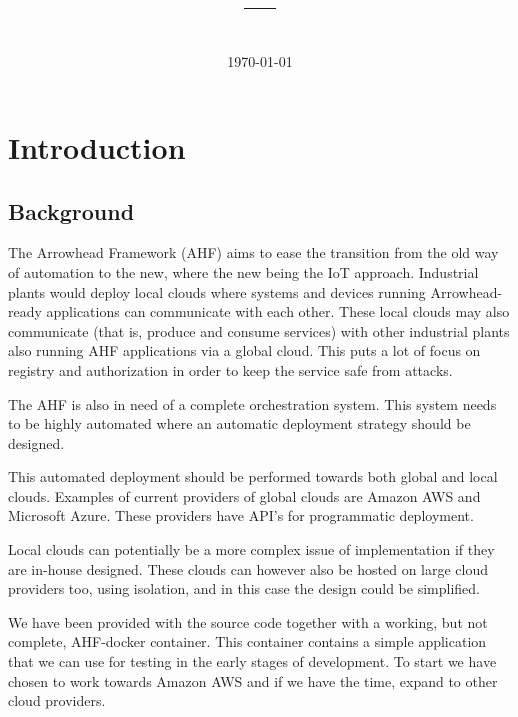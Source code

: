 \documentclass[a4paper,15pt,twoside]{article}
\title{\coursename{} --- \coursecode{} \break{}
  \projectname{}
  \author{\authorsinfo{}} \break{}
  \bigskip{} \break{}
  \schoolinfo{}}
\date{\today}
\begin{document}
\maketitle
\newpage

\tableofcontents
\clearpage
\section{Introduction}

\subsection{Background}
The Arrowhead Framework (AHF) aims to ease the transition from the old way of automation to the new, where the new being the IoT approach. Industrial plants would deploy local clouds where systems and devices running Arrowhead-ready applications can communicate with each other. These local clouds may also communicate (that is, produce and consume services) with other industrial plants also running AHF applications via a global cloud. This puts a lot of focus on registry and authorization in order to keep the service safe from attacks. 

The AHF is also in need of a complete orchestration system. This system needs to be highly automated where an automatic deployment strategy should be designed. 

This automated deployment should be performed towards both global and local clouds. Examples of current providers of global clouds are Amazon AWS and Microsoft Azure. These providers have API's for programmatic deployment. 

Local clouds can potentially be a more complex issue of implementation if they are in-house designed. These clouds can however also be hosted on large cloud providers too, using isolation, and in this case the design could be simplified.

We have been provided with the source code together with a working, but not complete, AHF-docker container. This container contains a simple application that we can use for testing in the early stages of development. To start we have chosen to work towards Amazon AWS and if we have the time, expand to other cloud providers.
\end{document}
